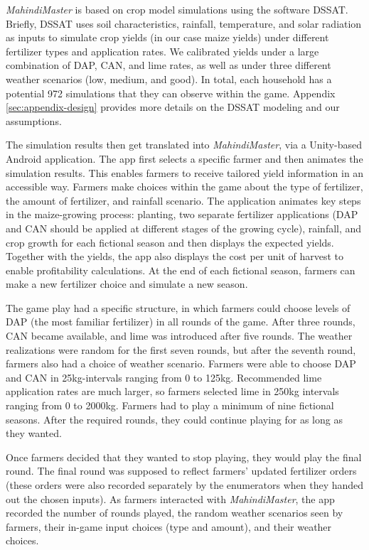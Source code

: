 \documentclass[12pt,letterpaper]{article}
\begin{document}
\textit{MahindiMaster} is based on crop model simulations using the software DSSAT. Briefly, DSSAT uses soil characteristics, rainfall, temperature, and solar radiation as inputs to simulate crop yields (in our case maize yields) under different fertilizer types and application rates. We calibrated yields under a large combination of DAP, CAN, and lime rates, as well as under three different weather scenarios (low, medium, and good). In total, each household has a potential 972 simulations that they can observe within the game. Appendix \ref{sec:appendix-design} provides more details on the DSSAT modeling and our assumptions.

The simulation results then get translated into \textit{MahindiMaster}, via a Unity-based Android application. The app first selects a specific farmer and then animates the simulation results. This enables farmers to receive tailored yield information in an accessible way. Farmers make choices within the game about the type of fertilizer, the amount of fertilizer, and rainfall scenario. The application animates key steps in the maize-growing process: planting, two separate fertilizer applications (DAP and CAN should be applied at different stages of the growing cycle), rainfall, and crop growth for each fictional season and then displays the expected yields. Together with the yields, the app also displays the cost per unit of harvest to enable profitability calculations. At the end of each fictional season, farmers can make a new fertilizer choice and simulate a new season. 

The game play had a specific structure, in which farmers could choose levels of DAP (the most familiar fertilizer) in all rounds of the game. After three rounds, CAN became available, and lime was introduced after five rounds. The weather realizations were random for the first seven rounds, but after the seventh round, farmers also had a choice of weather scenario. Farmers were able to choose DAP and CAN in 25kg-intervals ranging from 0 to 125kg. Recommended lime application rates are much larger, so farmers selected lime in 250kg intervals ranging from 0 to 2000kg. Farmers had to play a minimum of nine fictional seasons. After the required rounds, they could continue playing for as long as they wanted. 

Once farmers decided that they wanted to stop playing, they would play the final round. The final round was supposed to reflect farmers' updated fertilizer orders (these orders were also recorded separately by the enumerators when they handed out the chosen inputs). As farmers interacted with \textit{MahindiMaster}, the app recorded the number of rounds played, the random weather scenarios seen by farmers, their in-game input choices (type and amount), and their weather choices.
\end{document}
